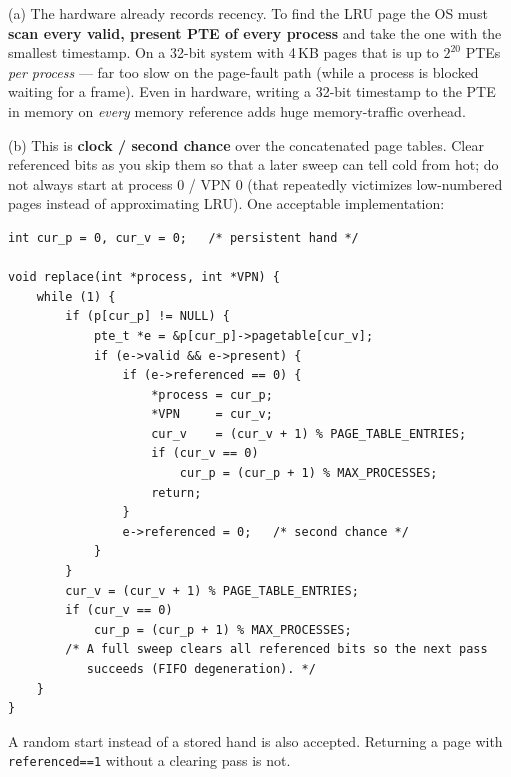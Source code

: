 \documentclass[11pt,a4paper]{article}
\newenvironment{Sol}{%
  \begin{tcolorbox}[sboxstyle, title={Solution}]%
}{%
  \end{tcolorbox}\vspace{0.35em}%
}
\begin{document}
\begin{Sol}
(a) The hardware already records recency. To find the LRU page the OS
must \textbf{scan every valid, present PTE of every process} and take
the one with the smallest timestamp. On a 32-bit system with 4\,KB
pages that is up to $2^{20}$ PTEs \emph{per process} --- far too slow
on the page-fault path (while a process is blocked waiting for a frame).
Even in hardware, writing a 32-bit timestamp to the PTE in memory on
\emph{every} memory reference adds huge memory-traffic overhead.

(b) This is \textbf{clock / second chance} over the concatenated page
tables. Clear referenced bits as you skip them so that a later sweep
can tell cold from hot; do not always start at process 0 / VPN 0
(that repeatedly victimizes low-numbered pages instead of approximating LRU). One acceptable implementation:

\begin{lstlisting}[numbers=none]
int cur_p = 0, cur_v = 0;   /* persistent hand */

void replace(int *process, int *VPN) {
    while (1) {
        if (p[cur_p] != NULL) {
            pte_t *e = &p[cur_p]->pagetable[cur_v];
            if (e->valid && e->present) {
                if (e->referenced == 0) {
                    *process = cur_p;
                    *VPN     = cur_v;
                    cur_v    = (cur_v + 1) % PAGE_TABLE_ENTRIES;
                    if (cur_v == 0)
                        cur_p = (cur_p + 1) % MAX_PROCESSES;
                    return;
                }
                e->referenced = 0;   /* second chance */
            }
        }
        cur_v = (cur_v + 1) % PAGE_TABLE_ENTRIES;
        if (cur_v == 0)
            cur_p = (cur_p + 1) % MAX_PROCESSES;
        /* A full sweep clears all referenced bits so the next pass
           succeeds (FIFO degeneration). */
    }
}
\end{lstlisting}
A random start instead of a stored hand is also accepted. Returning a
page with \texttt{referenced==1} without a clearing pass is not.
\end{Sol}
\end{document}
